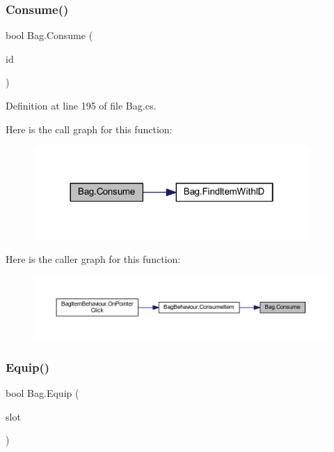 \subsubsection{\texorpdfstring{Consume()}{Consume()}}
{\footnotesize\ttfamily bool Bag.\+Consume (\begin{DoxyParamCaption}\item[{\mbox{\hyperlink{class_base_item_add9920d2f5a4fa91752714a8f3ab424b}{Base\+Item.\+ID}}}]{id }\end{DoxyParamCaption})}



Definition at line 195 of file Bag.\+cs.

Here is the call graph for this function\+:
\nopagebreak
\begin{figure}[H]
\begin{center}
\leavevmode
\includegraphics[width=298pt]{class_bag_a85aa679243be4a24a6278d5f68c2ed5e_cgraph}
\end{center}
\end{figure}
Here is the caller graph for this function\+:
\nopagebreak
\begin{figure}[H]
\begin{center}
\leavevmode
\includegraphics[width=350pt]{class_bag_a85aa679243be4a24a6278d5f68c2ed5e_icgraph}
\end{center}
\end{figure}
\mbox{\label{class_bag_a975e4ef7a5647327225e5b587b32c066}} 
\subsubsection{\texorpdfstring{Equip()}{Equip()}}
{\footnotesize\ttfamily bool Bag.\+Equip (\begin{DoxyParamCaption}\item[{int}]{slot }\end{DoxyParamCaption})}



